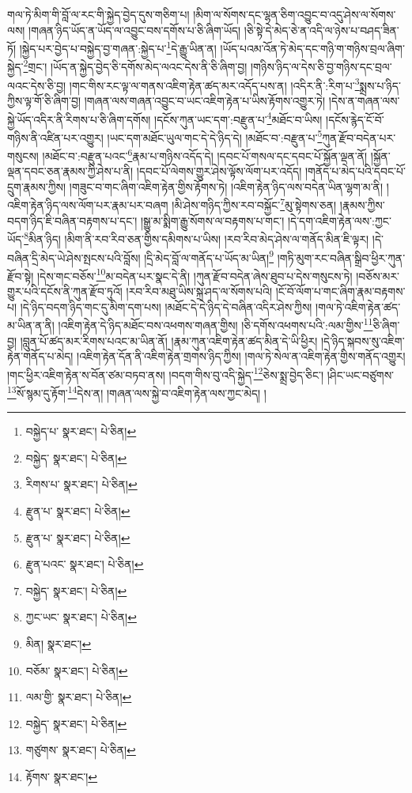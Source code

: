 གལ་ཏེ་མིག་གི་བློ་ལ་རང་གི་སྐྱེད་བྱེད་དུས་གཅིག་པ། །མིག་ལ་སོགས་དང་ལྷན་ཅིག་འབྱུང་བ་འདུ་ཤེས་ལ་སོགས་ལས། །གཞན་ཉིད་ཡོད་ན་ཡོད་ལ་འབྱུང་བས་དགོས་པ་ཅི་ཞིག་ཡོད། །ཅི་སྟེ་དེ་མེད་ཅེ་ན་འདི་ལ་ཉེས་པ་བཤད་ཟིན་ཏོ། །སྐྱེད་པར་བྱེད་པ་བསྐྱེད་བྱ་གཞན་:སྐྱེད་པ་\footnote{བསྐྱེད་པ་  སྣར་ཐང་།  པེ་ཅིན། }དེ་རྒྱུ་ཡིན་ན། །ཡོད་པའམ་འོན་ཏེ་མེད་དང་གཉི་ག་གཉིས་བྲལ་ཞིག་སྐྱེད་\footnote{བསྐྱེད་  སྣར་ཐང་།  པེ་ཅིན། }གྲང་། །ཡོད་ན་སྐྱེད་བྱེད་ཅི་དགོས་མེད་ལའང་དེས་ནི་ཅི་ཞིག་བྱ། །གཉིས་ཉིད་ལ་དེས་ཅི་བྱ་གཉིས་དང་བྲལ་ལའང་དེས་ཅི་བྱ། །གང་གིས་རང་ལྟ་ལ་གནས་འཇིག་རྟེན་ཚད་མར་འདོད་པས་ན། །འདིར་ནི་:རིག་པ་\footnote{རིགས་པ་  སྣར་ཐང་།  པེ་ཅིན། }སྨྲས་པ་ཉིད་ཀྱིས་ལྟ་གོ་ཅི་ཞིག་བྱ། །གཞན་ལས་གཞན་འབྱུང་བ་ཡང་འཇིག་རྟེན་པ་ཡིས་རྟོགས་འགྱུར་ཏེ། །དེས་ན་གཞན་ལས་སྐྱེ་ཡོད་འདིར་ནི་རིགས་པ་ཅི་ཞིག་དགོས། །དངོས་ཀུན་ཡང་དག་:བརྫུན་པ་\footnote{རྫུན་པ་  སྣར་ཐང་།  པེ་ཅིན། }མཐོང་བ་ཡིས། །དངོས་རྙེད་ངོ་བོ་གཉིས་ནི་འཛིན་པར་འགྱུར། །ཡང་དག་མཐོང་ཡུལ་གང་དེ་དེ་ཉིད་དེ། །མཐོང་བ་:བརྫུན་པ་\footnote{རྫུན་པ་  སྣར་ཐང་།  པེ་ཅིན། }ཀུན་རྫོབ་བདེན་པར་གསུངས། །མཐོང་བ་:བརྫུན་པའང་\footnote{རྫུན་པའང་  སྣར་ཐང་།  པེ་ཅིན། }རྣམ་པ་གཉིས་འདོད་དེ། །དབང་པོ་གསལ་དང་དབང་པོ་སྐྱོན་ལྡན་ནོ། །སྐྱོན་ལྡན་དབང་ཅན་རྣམས་ཀྱི་ཤེས་པ་ནི། །དབང་པོ་ལེགས་གྱུར་ཤེས་ལྟོས་ལོག་པར་འདོད། །གནོད་པ་མེད་པའི་དབང་པོ་དྲུག་རྣམས་ཀྱིས། །གཟུང་བ་གང་ཞིག་འཇིག་རྟེན་གྱིས་རྟོགས་ཏེ། །འཇིག་རྟེན་ཉིད་ལས་བདེན་ཡིན་ལྷག་མ་ནི། །འཇིག་རྟེན་ཉིད་ལས་ལོག་པར་རྣམ་པར་བཞག །མི་ཤེས་གཉིད་ཀྱིས་རབ་བསྐྱོང་\footnote{བསྐྱེད་  སྣར་ཐང་།  པེ་ཅིན། }མུ་སྟེགས་ཅན། །རྣམས་ཀྱིས་བདག་ཉིད་ཇི་བཞིན་བརྟགས་པ་དང་། །སྒྱུ་མ་སྨིག་རྒྱུ་སོགས་ལ་བརྟགས་པ་གང་། །དེ་དག་འཇིག་རྟེན་ལས་:ཀྱང་ཡོད་\footnote{ཀྱང་ཡང་  སྣར་ཐང་།  པེ་ཅིན། }མིན་ཉིད། །མིག་ནི་རབ་རིབ་ཅན་གྱིས་དམིགས་པ་ཡིས། །རབ་རིབ་མེད་ཤེས་ལ་གནོད་མིན་ཇི་ལྟར། །དེ་བཞིན་དྲི་མེད་ཡེ་ཤེས་སྤངས་པའི་བློས། །དྲི་མེད་བློ་ལ་གནོད་པ་ཡོད་མ་ཡིན།\footnote{མིན།  སྣར་ཐང་། } །གཏི་མུག་རང་བཞིན་སྒྲིབ་ཕྱིར་ཀུན་རྫོབ་སྟེ། །དེས་གང་བཅོས་\footnote{བཅོམ་  སྣར་ཐང་།  པེ་ཅིན། }མ་བདེན་པར་སྣང་དེ་ནི། །ཀུན་རྫོབ་བདེན་ཞེས་ཐུབ་པ་དེས་གསུངས་ཏེ། །བཅོས་མར་གྱུར་པའི་དངོས་ནི་ཀུན་རྫོབ་ཏུའོ། །རབ་རིབ་མཐུ་ཡིས་སྐྲ་ཤད་ལ་སོགས་པའི། །ངོ་བོ་ལོག་པ་གང་ཞིག་རྣམ་བརྟགས་པ། །དེ་ཉིད་བདག་ཉིད་གང་དུ་མིག་དག་པས། །མཐོང་དེ་དེ་ཉིད་དེ་བཞིན་འདིར་ཤེས་ཀྱིས། །གལ་ཏེ་འཇིག་རྟེན་ཚད་མ་ཡིན་ན་ནི། །འཇིག་རྟེན་དེ་ཉིད་མཐོང་བས་འཕགས་གཞན་གྱིས། །ཅི་དགོས་འཕགས་པའི་:ལམ་གྱིས་\footnote{ལམ་གྱི་  སྣར་ཐང་།  པེ་ཅིན། }ཅི་ཞིག་བྱ། །བླུན་པོ་ཚད་མར་རིགས་པའང་མ་ཡིན་ནོ། །རྣམ་ཀུན་འཇིག་རྟེན་ཚད་མིན་དེ་ཡི་ཕྱིར། །དེ་ཉིད་སྐབས་སུ་འཇིག་རྟེན་གནོད་པ་མེད། །འཇིག་རྟེན་དོན་ནི་འཇིག་རྟེན་གྲགས་ཉིད་ཀྱིས། །གལ་ཏེ་སེལ་ན་འཇིག་རྟེན་གྱིས་གནོད་འགྱུར། །གང་ཕྱིར་འཇིག་རྟེན་ས་བོན་ཙམ་བཏབ་ནས། །བདག་གིས་བུ་འདི་སྐྱེད་\footnote{བསྐྱེད་  སྣར་ཐང་།  པེ་ཅིན། }ཅེས་སྨྲ་བྱེད་ཅིང་། །ཤིང་ཡང་བཙུགས་\footnote{གཙུགས་  སྣར་ཐང་།  པེ་ཅིན། }སོ་སྙམ་དུ་རྟོག་\footnote{རྟོགས་  སྣར་ཐང་། }དེས་ན། །གཞན་ལས་སྐྱེ་བ་འཇིག་རྟེན་ལས་ཀྱང་མེད། །

